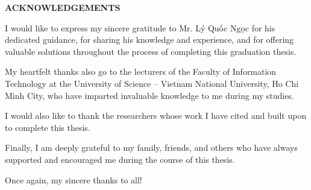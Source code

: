 \vspace{2cm}

{}

{\MakeUppercase\centering\Large\bfseries ACKNOWLEDGEMENTS}

\vspace{2cm}
{
	
	I would like to express my sincere gratitude to Mr. Lý Quốc Ngọc for his dedicated guidance, for sharing his knowledge and experience, and for offering valuable solutions throughout the process of completing this graduation thesis.
	
	My heartfelt thanks also go to the lecturers of the Faculty of Information Technology at the University of Science – Vietnam National University, Ho Chi Minh City, who have imparted invaluable knowledge to me during my studies.
	
	I would also like to thank the researchers whose work I have cited and built upon to complete this thesis.
	
	Finally, I am deeply grateful to my family, friends, and others who have always supported and encouraged me during the course of this thesis.
	
	Once again, my sincere thanks to all!
}

\pagebreak
